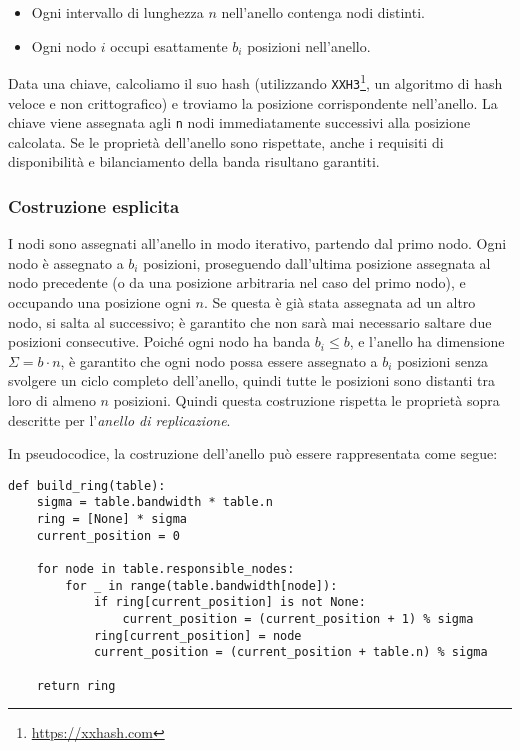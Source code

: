 \begin{itemize}
    \item Ogni intervallo di lunghezza $n$ nell'anello contenga nodi distinti.
    \item Ogni nodo $i$ occupi esattamente $b_i$ posizioni nell'anello.
\end{itemize}

Data una chiave, calcoliamo il suo hash (utilizzando \texttt{XXH3}\footnote{\url{https://xxhash.com}}, un algoritmo di hash veloce e non crittografico) e troviamo la posizione corrispondente nell'anello.
La chiave viene assegnata agli \texttt{n} nodi immediatamente successivi alla posizione calcolata.
Se le proprietà dell'anello sono rispettate, anche i requisiti di disponibilità e bilanciamento della banda risultano garantiti.

\subsubsection{Costruzione esplicita}
\label{subsubsec:costruzione-esplicita}

I nodi sono assegnati all'anello in modo iterativo, partendo dal primo nodo.
Ogni nodo è assegnato a $b_i$ posizioni, proseguendo dall'ultima posizione assegnata al nodo precedente (o da una posizione arbitraria nel caso del primo nodo), e occupando una posizione ogni $n$.
Se questa è già stata assegnata ad un altro nodo, si salta al successivo; è garantito che non sarà mai necessario saltare due posizioni consecutive.
Poiché ogni nodo ha banda $b_i \leq b$, e l'anello ha dimensione $\Sigma = b \cdot n$, è garantito che ogni nodo possa essere assegnato a $b_i$ posizioni senza svolgere un ciclo completo dell'anello, quindi tutte le posizioni sono distanti tra loro di almeno $n$ posizioni.
Quindi questa costruzione rispetta le proprietà sopra descritte per l'\emph{anello di replicazione}.

\begin{samepage}
\noindent In pseudocodice, la costruzione dell'anello può essere rappresentata come segue:
\begin{verbatim}
def build_ring(table):
    sigma = table.bandwidth * table.n
    ring = [None] * sigma
    current_position = 0

    for node in table.responsible_nodes:
        for _ in range(table.bandwidth[node]):
            if ring[current_position] is not None:
                current_position = (current_position + 1) % sigma
            ring[current_position] = node
            current_position = (current_position + table.n) % sigma

    return ring
\end{verbatim}
\end{samepage}

